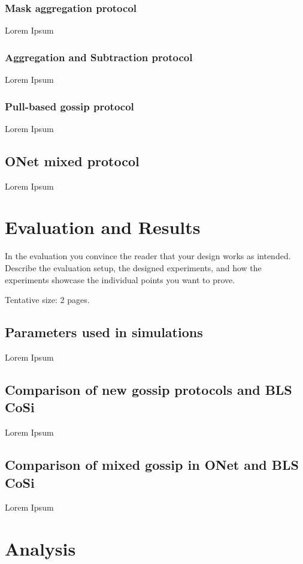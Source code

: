 \documentclass[a4paper,11pt,oneside]{report}
\begin{document}
\subsection{Mask aggregation protocol}
Lorem Ipsum

\subsection{Aggregation and Subtraction protocol}
Lorem Ipsum

\subsection{Pull-based gossip protocol}
Lorem Ipsum

\section{ONet mixed protocol}
Lorem Ipsum

\chapter{Evaluation and Results}

In the evaluation you convince the reader that your design works as intended.
Describe the evaluation setup, the designed experiments, and how the
experiments showcase the individual points you want to prove.

Tentative size: 2 pages.

\section{Parameters used in simulations}
Lorem Ipsum

\section{Comparison of new gossip protocols and BLS CoSi}
Lorem Ipsum

\section{Comparison of mixed gossip in ONet and BLS CoSi}
Lorem Ipsum

\chapter{Analysis}
\end{document}

